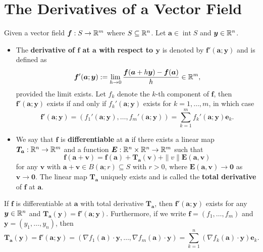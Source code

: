     \section{The Derivatives of a Vector Field}
    \begin{definitionenv}
        Given a vector field $\bm f:S\to \mathbb{R}^m$ where $S\subseteq \mathbb{R}^n$. Let $\bm a \in \operatorname{int} S$ and $\bm y \in \mathbb{R}^n$.
        \begin{itemize}
            \item The \textbf{derivative of $\bm f$ at $\bm a$ with respect to $\bm y$} is denoted by $\bm f'(\bm a; \bm y)$ and is defined as
            $$ \bm{f}'(\bm a; \bm y) := \lim_{h\to 0} \frac{\bm f(\bm a + h \bm y) - \bm f(\bm a)}{h}\in \mathbb{R}^m, $$
            provided the limit exists. Let $f_k$ denote the $k$-th component of $\bm f$, then $\bm f'(\bm a; \bm y) $ exists if and only if $f_k'(\bm a; \bm y)$ exists for $k=1, \ldots, m$, in which case $$\bm f'(\bm a; \bm y) = (f_1'(\bm a; \bm y), \ldots, f_m'(\bm a; \bm y))=\sum_{k=1}^m f_k'(\bm a; \bm y) \bm e_k.$$        
            \item We say that $\bm f$ is \textbf{differentiable} at $\bm a$ if there exists a linear map $\bm T_{\bm a}:\mathbb{R}^n \to \mathbb{R}^m$ and a function $\bm E:\mathbb{R}^n \times \mathbb{R}^n \to \mathbb{R}^m$ such that
            $$ \bm f(\bm a + \bm v) = \bm f(\bm a) + \bm T_{\bm a}(\bm v) + \|v\| \bm E(\bm a, \bm v) $$
            for any $\bm v$ with $\bm a + \bm v \in B(\bm a;r)\subseteq S$ with $r>0$, where $\bm E(\bm a, \bm v) \to \bm 0$ as $\bm v \to \bm 0$. The linear map $\bm T_{\bm a}$ uniquely exists and is called the \textbf{total derivative} of $\bm f$ at $\bm a$.
        \end{itemize}
    \end{definitionenv}
    \begin{theoremenv}
        If $\bm f$ is differentiable at $\bm a$ with total derivative $\bm T_{\bm a}$, then $\bm f'(\bm a; \bm y)$ exists for any $\bm y\in \mathbb{R}^n$ and $\bm T_{\bm a}(\bm y) = \bm f'(\bm a; \bm y)$. Furthermore, if we write $\bm f = (f_1, \ldots, f_m)$ and $\bm y = (y_1, \ldots, y_n)$, then
        $$ \bm T_{\bm a}(\bm y) = \bm f'(\bm a; \bm y) = \left( \nabla f_1(\bm a) \cdot \bm y, \ldots, \nabla f_m(\bm a) \cdot \bm y \right) = \sum_{k=1}^n \left( \nabla f_k (\bm a) \cdot \bm y \right) \bm e_k. $$
    \end{theoremenv}
